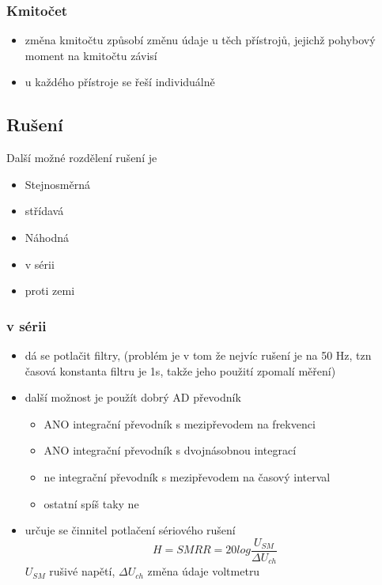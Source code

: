 \subsubsection*{Kmitočet}
\begin{itemize}
    \item změna kmitočtu způsobí změnu údaje u těch přístrojů, jejichž pohybový moment na
          kmitočtu závisí
    \item u každého přístroje se řeší individuálně
\end{itemize}

\subsection{Rušení}
Další možné rozdělení rušení je
\begin{itemize}
    \item Stejnosměrná
    \item střídavá
    \item Náhodná
    \item v sérii
    \item proti zemi
\end{itemize}

\subsubsection{v sérii}
\begin{itemize}
    \item dá se potlačit filtry, (problém je v tom že nejvíc rušení je na 50 Hz, tzn
          časová konstanta filtru je 1s, takže jeho použití zpomalí měření)
    \item další možnost je použít dobrý AD převodník
          \begin{itemize}
              \item ANO integrační převodník s mezipřevodem na frekvenci
              \item ANO integrační převodník s dvojnásobnou integrací
              \item ne integrační převodník s mezipřevodem na časový interval
              \item ostatní spíš taky ne
          \end{itemize}
    \item určuje se činnitel potlačení sériového rušení
          \begin{equation}
              H=SMRR= 20log\frac{U_{SM}}{\Delta U_{ch}}
          \end{equation}
          $U_{SM}$ rušivé napětí, $ \Delta U_{ch} $ změna údaje voltmetru
\end{itemize}

